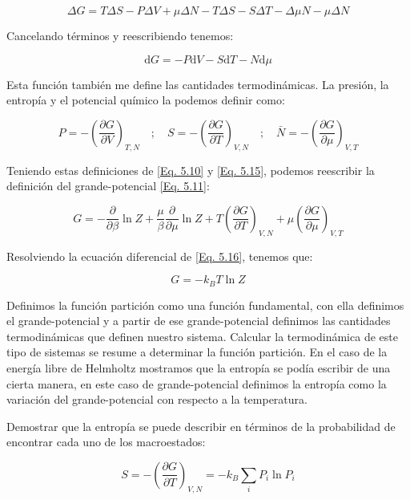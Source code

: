 \documentclass[11pt,fleqn]{book}
\begin{document}
\begin{equation*}
    \Delta G=T\Delta S-P\Delta V+\mu\Delta N-T\Delta S-S\Delta T-\Delta\mu N-\mu\Delta N 
\end{equation*}

Cancelando términos y reescribiendo tenemos:

\begin{equation}
    \mathrm{d}G=-P\mathrm{d}V-S\mathrm{d}T-N\mathrm{d}\mu   
    \label{Eq. 5.14}
\end{equation}

Esta función también me define las cantidades termodinámicas. La presión, la entropía y el potencial químico la podemos definir como:

\begin{equation}
    P=-\left(\frac{\partial G}{\partial V}\right)_{T,N}\quad;\quad S=-\left(\frac{\partial G}{\partial T}\right)_{V,N}\quad;\quad \bar{N}=-\left(\frac{\partial G}{\partial \mu}\right)_{V,T}    \label{Eq. 5.15}
\end{equation}

Teniendo estas definiciones de \ref{Eq. 5.10} y \ref{Eq. 5.15}, podemos reescribir la definición del grande-potencial \ref{Eq. 5.11}:

\begin{equation}
        G=-\frac{\partial}{\partial\beta}\ln{Z}+\frac{\mu}{\beta}\frac{\partial}{\partial\mu}\ln{Z}+T\left(\frac{\partial G}{\partial T}\right)_{V,N}+\mu\left(\frac{\partial G}{\partial \mu}\right)_{V,T}   
    \label{Eq. 5.16}
\end{equation}

Resolviendo la ecuación diferencial de \ref{Eq. 5.16}, tenemos que:

\begin{equation}
    G=-k_{B}T\ln{Z}
    \label{Eq. 5.17}
\end{equation}      

Definimos la función partición como una función fundamental, con ella definimos el grande-potencial y a partir de ese grande-potencial definimos las cantidades termodinámicas que definen nuestro sistema. Calcular la termodinámica de este tipo de sistemas se resume a determinar la función partición. En el caso de la energía libre de Helmholtz mostramos que la entropía se podía escribir de una cierta manera, en este caso de grande-potencial definimos la entropía como la variación del grande-potencial con respecto a la temperatura.

\begin{exercise}
Demostrar que la entropía se puede describir en términos de la probabilidad de encontrar cada uno de los macroestados:

\begin{equation*}
    S=-\left(\frac{\partial G}{\partial T}\right)_{V,N}=-k_{B}\sum_{i}P_{i}\ln{P_{i}}
\end{equation*}
\end{exercise}
\end{document}
